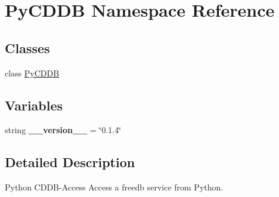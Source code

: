 \hypertarget{namespacePyCDDB}{
\section{PyCDDB Namespace Reference}
\label{namespacePyCDDB}
}
\subsection*{Classes}
\begin{DoxyCompactItemize}
\item 
class \hyperlink{classPyCDDB_1_1PyCDDB}{PyCDDB}
\end{DoxyCompactItemize}
\subsection*{Variables}
\begin{DoxyCompactItemize}
\item 
\hypertarget{namespacePyCDDB_ac64fc70bb55736362a414c0663cd5c6d}{
string {\bfseries \_\-\_\-version\_\-\_\-} = \char`\"{}0.1.4\char`\"{}}
\label{namespacePyCDDB_ac64fc70bb55736362a414c0663cd5c6d}

\end{DoxyCompactItemize}


\subsection{Detailed Description}
\begin{DoxyVerb}Python CDDB-Access
Access a freedb service from Python.
\end{DoxyVerb}
 